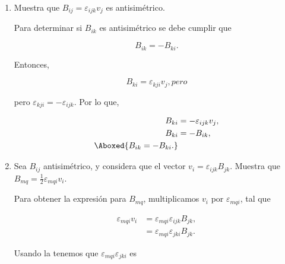\documentclass[../main.tex]{subfiles}
\begin{document}
\begin{problema}
\begin{enumerate}
		      Renombrando índices \(m = i, n = j\),

		      \begin{empheq}[box=\mainresult]{equation}
			      \varepsilon_{ijk}\varepsilon_{pqk}  = \delta_{ip}\delta_{jq} - \delta_{iq}\delta_{jp}.
			      \label{eq:epsilon-delta}
		      \end{empheq}

		      \pagebreak
		\item Muestra que \(B_{ij} = \varepsilon_{ijk}v_{j}\) es antisimétrico.

		      \startsolution

		      Para determinar si \(B_{ik}\) es antisimétrico se debe cumplir que

		      \begin{equation*}
			      B_{ik} = - B_{ki}.
		      \end{equation*}

		      Entonces,

		      \begin{equation*}
			      B_{ki} = \varepsilon_{kji}v_{j}, pero
		      \end{equation*}

		      pero \(\varepsilon_{kji} = - \varepsilon_{ijk}\). Por lo que,

		      \begin{align*}
			      B_{ki} & = - \varepsilon_{ijk}v_{j}, \\
			      B_{ki} & = - B_{ik},                 \\
			      \Aboxed{B_{ik} = - B_{ki}.}
		      \end{align*}
		\item Sea \(B_{ij}\) antisimétrico, y considera que el vector \(v_{i} = \varepsilon_{ijk}B_{jk}\). Muestra que \(B_{mq} = \tfrac{1}{2}\varepsilon_{mqi}v_{i}\).

		      \startsolution

		      Para obtener la expresión para \(B_{mq}\), multiplicamos \(v_{i}\) por \(\varepsilon_{mqi}\), tal que

		      \begin{align*}
			      \varepsilon_{mqi}v_{i} & = \varepsilon_{mqi}\varepsilon_{ijk}B_{jk}, \\
			                             & = \varepsilon_{mqi}\varepsilon_{jki}B_{jk}.
		      \end{align*}

		      Usando la  tenemos que \(\varepsilon_{mqi}\varepsilon_{jki}\) es


\end{enumerate}
\end{problema}
\end{document}
